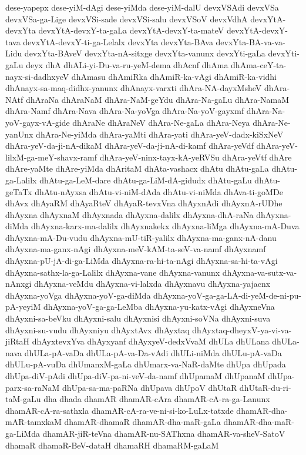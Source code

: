 {dese-yapepx
dese-yiM-dAgi
dese-yiMda
dese-yiM-dalU
devxVSAdi
devxVSa
devxVSa-ga-Lige
devxVSi-sade
devxVSi-salu
devxVSoV
devxVdhA
devxYtA-devxYta
devxYtA-devxY-ta-gaLa
devxYtA-devxY-ta-mateV
devxYtA-devxY-tava
devxYtA-devxY-ti-ga-Lelalx
devxYta
devxYta-BAva
devxYta-BA-va-va-Lidu
devxYta-BAveV
devxYta-nA-sitxge
devxYta-vanunx
devxYti-gaLa
devxYti-gaLu
deyx
dhA
dhALi-yi-Du-va-ru-yeM-dema
dhAcnf
dhAma
dhAma-ceY-ta-nayx-si-dadhxyeV
dhAmasu
dhAmiRka
dhAmiR-ka-vAgi
dhAmiR-ka-vidhi
dhAnayx-sa-maq-didhx-yanunx
dhAnayx-varxti
dhAra-NA-dayxMsheV
dhAra-NAtf
dhAraNa
dhAraNaM
dhAra-NaM-geYdu
dhAra-Na-gaLu
dhAra-NamaM
dhAra-Namf
dhAra-Nava
dhAra-Na-yoVga
dhAra-Na-yoV-gayxmf
dhAra-Na-yoV-gayx-vA-gide
dhAraNe
dhAraNeV
dhAra-Ne-gaLa
dhAra-Neya
dhAra-Ne-yanUnx
dhAra-Ne-yiMda
dhAra-yaMti
dhAra-yati
dhAra-yeV-dadx-kiSxNeV
dhAra-yeV-da-ji-nA-dikaM
dhAra-yeV-da-ji-nA-di-kamf
dhAra-yeVdf
dhAra-yeV-lilxM-ga-meY-shavx-ramf
dhAra-yeV-ninx-tayx-kA-yeRVSu
dhAra-yeVtf
dhAre
dhAre-yaMte
dhAre-yiMda
dhAritaM
dhAta-vashacx
dhAtu
dhAtu-gaLa
dhAtu-ga-Lalilx
dhAtu-ga-LeM-dare
dhAtu-ga-LiM-dA-gidudx
dhAtu-gaLu
dhAtu-geTaTx
dhAtu-nAyxsa
dhAtu-vi-niM-dAda
dhAtu-vi-niMda
dhAva-ti-goMDe
dhAvx
dhAyaRM
dhAyaRteV
dhAyaR-tevxVna
dhAyxnAdi
dhAyxnA-rUDhe
dhAyxna
dhAyxnaM
dhAyxnada
dhAyxna-dalilx
dhAyxna-dhA-raNa
dhAyxna-diMda
dhAyxna-karx-ma-dalilx
dhAyxnakekx
dhAyxna-liMga
dhAyxna-mA-Duva
dhAyxna-mA-Du-vudu
dhAyxna-mU-tiR-yalilx
dhAyxna-ma-ganx-nA-danu
dhAyxna-ma-ganx-nAgi
dhAyxna-meV-kAM-ta-seV-va-namf
dhAyxnamf
dhAyxna-pU-jA-di-ga-LiMda
dhAyxna-ra-hi-ta-nAgi
dhAyxna-sa-hi-ta-vAgi
dhAyxna-sathx-la-ga-Lalilx
dhAyxna-vane
dhAyxna-vanunx
dhAyxna-va-sutx-va-nAnxgi
dhAyxna-veMdu
dhAyxna-vi-lalxda
dhAyxnavu
dhAyxna-yajacnx
dhAyxna-yoVga
dhAyxna-yoV-ga-diMda
dhAyxna-yoV-ga-ga-LA-di-yeM-de-ni-pu-pA-yeyiM
dhAyxna-yoV-ga-ga-LeMba
dhAyxna-yu-katx-vAgi
dhAyxneVna
dhAyxni-sa-beVku
dhAyxni-salu
dhAyxnisi
dhAyxni-soVNa
dhAyxni-suva
dhAyxni-su-vudu
dhAyxniyu
dhAyxtAvx
dhAyxtaq
dhAyxtaq-dheyxV-ya-vi-va-jiRtaH
dhAyxtevxYva
dhAyxyanf
dhAyxyeV-dedxVvaM
dhULa
dhULana
dhULa-nava
dhULa-pA-vaDa
dhULa-pA-va-Da-vAdi
dhULi-niMda
dhULu-pA-vaDa
dhULu-pA-vuDa
dhUmanxM-gaLa
dhUmarx-va-NaR-daMte
dhUpa
dhUpada
dhUpa-diV-pAdi
dhUpa-diV-pa-ni-veV-da-namf
dhUpamaM
dhUpanaM
dhUpa-parx-sa-raNaM
dhUpa-sa-ma-paRNa
dhUpava
dhUpoV
dhUtaR
dhUtaR-du-ri-taM-gaLu
dha
dhada
dhamAR
dhamAR-cAra
dhamAR-cA-ra-ga-Lanunx
dhamAR-cA-ra-sathxla
dhamAR-cA-ra-ve-ni-si-ko-LuLx-tatxde
dhamAR-dha-mAR-tamxkaM
dhamAR-dhamaR
dhamAR-dha-maR-gaLa
dhamAR-dha-maR-ga-LiMda
dhamAR-jiR-teVna
dhamAR-nu-SAThxna
dhamAR-va-sheV-SatoV
dhamaR
dhamaR-BeV-dataH
dhamaRH
dhamaRM-gaLaM
}
